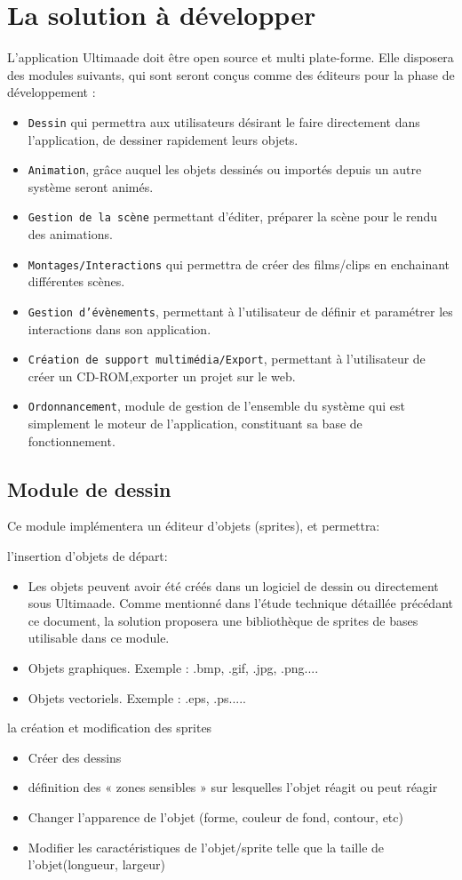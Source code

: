 \documentclass{ultimaade-fr}
\begin{document}
\section{La solution à développer}

L’application Ultimaade doit être open source et multi plate-forme. Elle disposera des modules suivants, qui sont seront conçus comme des éditeurs          pour la phase de développement :
\begin{itemize}
\item \texttt{Dessin}   qui   permettra   aux   utilisateurs   désirant   le   faire   directement   dans l'application, de dessiner rapidement leurs objets.
\item \texttt{Animation}, grâce auquel les objets dessinés ou importés depuis un autre système seront animés.
\item \texttt{Gestion  de  la  scène}  permettant  d'éditer,  préparer  la  scène  pour  le  rendu  des animations.
\item \texttt{Montages/Interactions}   qui   permettra   de   créer   des   films/clips   en enchainant différentes scènes.
\item \texttt{Gestion  d’évènements},  permettant  à  l'utilisateur  de  définir  et  paramétrer  les interactions dans son application.
\item \texttt{Création de support multimédia/Export}, permettant à l’utilisateur de créer un CD-ROM,exporter un projet sur le web.
\item \texttt{Ordonnancement}, module de  gestion  de  l’ensemble  du  système  qui  est  simplement  le moteur de l’application, constituant sa base de fonctionnement.\
\end{itemize}


\subsection{Module de dessin}
Ce module implémentera un éditeur d’objets (sprites), et permettra:

l’insertion d’objets de départ:
\begin{itemize}
\item Les objets peuvent avoir été créés dans un logiciel de dessin ou directement sous Ultimaade.	Comme	mentionné dans	l’étude	technique	détaillée	précédant ce document, la solution proposera une bibliothèque de sprites de bases utilisable dans ce module.
\item Objets graphiques. Exemple : .bmp, .gif, .jpg, .png....
\item Objets vectoriels. Exemple : .eps, .ps.....
\end{itemize}
la création et modification des sprites
\begin{itemize}
\item Créer des dessins
\item définition des « zones sensibles » sur lesquelles l'objet réagit ou peut réagir
\item Changer l'apparence de l'objet (forme, couleur de fond, contour, etc)
\item Modifier les caractéristiques de l’objet/sprite telle que la taille de l'objet(longueur, largeur)
\end{itemize}
\end{document}
